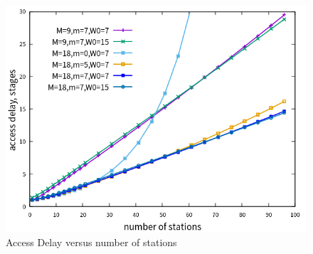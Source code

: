 \begin{figure}[!ht]
\includegraphics[scale=.54]{./figure/n_rule_delay_perf.png}
\caption{Access Delay versus number of stations}
\label{fig_n_delay_val}
\end{figure}